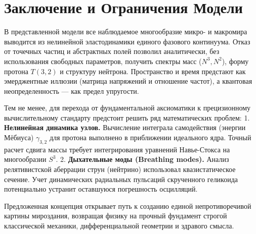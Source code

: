\documentclass[11pt,a4paper]{article}
\begin{document}
\section*{Заключение и Ограничения Модели}

В представленной модели все наблюдаемое многообразие микро- и макромира выводится из нелинейной эластодинамики единого фазового континуума. Отказ от точечных частиц и абстрактных полей позволил аналитически, без использования свободных параметров, получить спектры масс ($N^3, N^2$), форму протона $T(3,2)$ и структуру нейтрона. Пространство и время предстают как эмерджентные иллюзии (матрица напряжений и отношение частот), а квантовая неопределенность — как предел упругости.

Тем не менее, для перехода от фундаментальной аксиоматики к прецизионному вычислительному стандарту предстоит решить ряд математических проблем:
1. \textbf{Нелинейная динамика узлов.} Вычисление интеграла самодействия (энергии Мёбиуса) $\gamma_{3,2}$ для протона выполнено в приближении идеального ядра. Точный расчет сдвига массы требует интегрирования уравнений Навье-Стокса на многообразии $S^3$.
2. \textbf{Дыхательные моды (Breathing modes).} Анализ релятивистской аберрации струн (нейтрино) использовал квазистатическое сечение. Учет динамических радиальных пульсаций скрученного геликоида потенциально устранит оставшуюся погрешность осцилляций.

Предложенная концепция открывает путь к созданию единой непротиворечивой картины мироздания, возвращая физику на прочный фундамент строгой классической механики, дифференциальной геометрии и здравого смысла.
\end{document}
